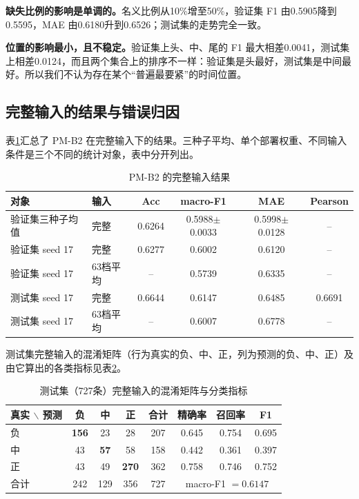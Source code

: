 \textbf{缺失比例的影响是单调的。}名义比例从10\%增至50\%，验证集 F1 由0.5905降到0.5595，MAE 由0.6180升到0.6526；测试集的走势完全一致。

\textbf{位置的影响最小，且不稳定。}验证集上头、中、尾的 F1 最大相差0.0041，测试集上相差0.0124，而且两个集合上的排序不一样：验证集是头最好，测试集是中间最好。所以我们不认为存在某个“普遍最要紧”的时间位置。

\subsection{完整输入的结果与错误归因}\label{sec:q2err}

表\ref{tab:q2full}汇总了 PM-B2 在完整输入下的结果。三种子平均、单个部署权重、不同输入条件是三个不同的统计对象，表中分开列出。

\begin{table}[htbp]
\centering
\caption{PM-B2 的完整输入结果}
\label{tab:q2full}
\begin{tabular}{llcccc}
\toprule
对象 & 输入 & Acc & macro-F1 & MAE & Pearson \\
\midrule
验证集三种子均值 & 完整 & 0.6264 & 0.5988$\pm$0.0033 & 0.5998$\pm$0.0128 & -- \\
验证集 seed 17 & 完整 & 0.6277 & 0.6002 & 0.6120 & -- \\
验证集 seed 17 & 63档平均 & -- & 0.5739 & 0.6335 & -- \\
测试集 seed 17 & 完整 & 0.6644 & 0.6147 & 0.6485 & 0.6691 \\
测试集 seed 17 & 63档平均 & -- & 0.6007 & 0.6778 & -- \\
\bottomrule
\end{tabular}
\end{table}

测试集完整输入的混淆矩阵（行为真实的负、中、正，列为预测的负、中、正）及由它算出的各类指标见表\ref{tab:cm}。

\begin{table}[htbp]
\centering
\caption{测试集（727条）完整输入的混淆矩阵与分类指标}
\label{tab:cm}
\begin{tabular}{l|ccc|c|ccc}
\toprule
真实 $\backslash$ 预测 & 负 & 中 & 正 & 合计 & 精确率 & 召回率 & F1 \\
\midrule
负 & \textbf{156} & 23 & 28 & 207 & 0.645 & 0.754 & 0.695 \\
中 & 43 & \textbf{57} & 58 & 158 & 0.442 & 0.361 & 0.397 \\
正 & 43 & 49 & \textbf{270} & 362 & 0.758 & 0.746 & 0.752 \\
\midrule
合计 & 242 & 129 & 356 & 727 & \multicolumn{3}{c}{macro-F1 $=0.6147$} \\
\bottomrule
\end{tabular}
\end{table}

